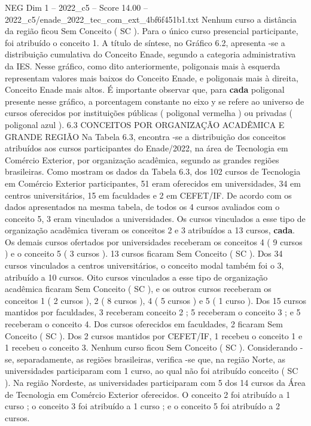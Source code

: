 \begin{textsample}{NEG Dim 1 – 2022\_c5 – Score 14.00 – 2022\_c5/enade\_2022\_tec\_com\_ext\_4bf6f451b1.txt}
Nenhum curso a distância da região ficou Sem Conceito ( SC ).
Para o único curso presencial participante, foi atribuído o conceito 1.
A título de síntese, no Gráfico 6.2, apresenta -se a distribuição cumulativa do Conceito Enade, segundo a categoria administrativa da IES.
Nesse gráfico, como dito anteriormente, poligonais mais à esquerda representam valores mais baixos do Conceito Enade, e poligonais mais à direita, Conceito Enade mais altos.
É importante observar que, para \textbf{cada} poligonal presente nesse gráfico, a porcentagem constante no eixo y se refere ao universo de cursos oferecidos por instituições públicas ( poligonal vermelha ) ou privadas ( poligonal azul ). 6.3 CONCEITOS POR ORGANIZAÇÃO ACADÊMICA E GRANDE REGIÃO Na Tabela 6.3, encontra -se a distribuição dos conceitos atribuídos aos cursos participantes do Enade/2022, na área de Tecnologia em Comércio Exterior, por organização acadêmica, segundo as grandes regiões brasileiras.
Como mostram os dados da Tabela 6.3, dos 102 cursos de Tecnologia em Comércio Exterior participantes, 51 eram oferecidos em universidades, 34 em centros universitários, 15 em faculdades e 2 em CEFET/IF.
De acordo com os dados apresentados na mesma tabela, de todos os 4 cursos avaliados com o conceito 5, 3 eram vinculados a universidades.
Os cursos vinculados a esse tipo de organização acadêmica tiveram os conceitos 2 e 3 atribuídos a 13 cursos, \textbf{cada}.
Os demais cursos ofertados por universidades receberam os conceitos 4 ( 9 cursos ) e o conceito 5 ( 3 cursos ). 13 cursos ficaram Sem Conceito ( SC ).
Dos 34 cursos vinculados a centros universitários, o conceito modal também foi o 3, atribuído a 10 cursos.
Oito cursos vinculados a esse tipo de organização acadêmica ficaram Sem Conceito ( SC ), e os outros cursos receberam os conceitos 1 ( 2 cursos ), 2 ( 8 cursos ), 4 ( 5 cursos ) e 5 ( 1 curso ).
Dos 15 cursos mantidos por faculdades, 3 receberam conceito 2 ; 5 receberam o conceito 3 ; e 5 receberam o conceito 4.
Dos cursos oferecidos em faculdades, 2 ficaram Sem Conceito ( SC ).
Dos 2 cursos mantidos por CEFET/IF, 1 recebeu o conceito 1 e 1 recebeu o conceito 3.
Nenhum curso ficou Sem Conceito ( SC ).
Considerando -se, separadamente, as regiões brasileiras, verifica -se que, na região Norte, as universidades participaram com 1 curso, ao qual não foi atribuído conceito ( SC ).
Na região Nordeste, as universidades participaram com 5 dos 14 cursos da Área de Tecnologia em Comércio Exterior oferecidos.
O conceito 2 foi atribuído a 1 curso ; o conceito 3 foi atribuído a 1 curso ; e o conceito 5 foi atribuído a 2 cursos.

\end{textsample}
